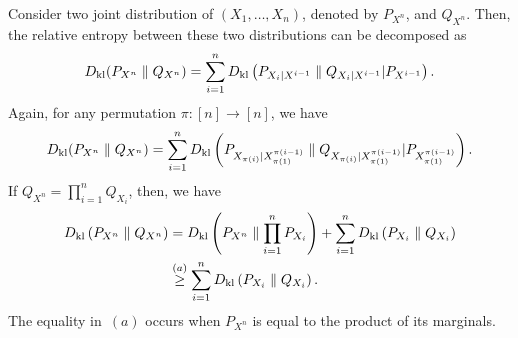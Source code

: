             \begin{theorem}
                \label{thm:chain-rule-rel-ent}
                Consider two joint distribution of $(X_1, \ldots, X_n)$, denoted by $P_{X^n}$, and $Q_{X^n}$. Then, the relative entropy between these two distributions can be decomposed as 
                \begin{align}
                    D_{\text{kl}}(P_{X^n} \parallel Q_{X^n}) = \sum_{i=1}^n D_{\text{kl}}\left( P_{X_i|X^{i-1}} \parallel Q_{X_i|X^{i-1}} \vert P_{X^{i-1}}\right). \label{eq:chain-rule-kl-1}
                \end{align}
                Again, for any permutation $\pi:[n] \to [n]$, we have 
                \begin{align}
                    D_{\text{kl}}(P_{X^n} \parallel Q_{X^n}) = \sum_{i=1}^n D_{\text{kl}}\left( P_{X_{\pi(i)}|X_{\pi(1)}^{\pi(i-1)}} \parallel Q_{X_{\pi(i)}|X_{\pi(1)}^{\pi(i-1)}} \vert P_{X_{\pi(1)}^{\pi(i-1)}}\right). 
                \end{align}
                If $Q_{X^n} = \prod_{i=1}^n Q_{X_i}$, then, we have 
                \begin{align}
                    D_{\text{kl}}\left( P_{X^n} \parallel Q_{X^n} \right) &= D_{\text{kl}}\left( P_{X^n} \parallel \prod_{i=1}^n P_{X_i} \right) + \sum_{i=1}^n D_{\text{kl}} \left( P_{X_i} \parallel Q_{X_i} \right)  \label{eq:chain-rule-kl-2}\\
                    & \stackrel{(a)}{\geq}   \sum_{i=1}^n D_{\text{kl}} \left( P_{X_i} \parallel Q_{X_i} \right).  \label{eq:chain-rule-kl-3}
                \end{align}
                The equality in~$(a)$ occurs when $P_{X^n}$ is equal to the product of its marginals. 
            \end{theorem}

